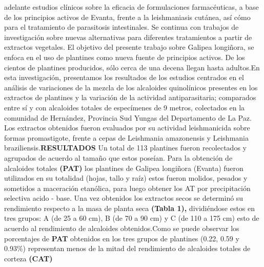 \documentclass{article}
\begin{document}
adelante estudios clínicos sobre la eficacia de formulaciones farmacéuticas, a base de los principios activos de Evanta, frente a la leishmaniasis cutánea, así cómo para el tratamiento de parasitosis intestinales. Se continua con trabajos de investigación sobre nuevas alternativas para diferentes tratamientos a partir de extractos vegetales. El objetivo del presente trabajo sobre Galipea longiñora, se enfoca en el uso de plantines como nueva fuente de principios activos. De los cientos de plantines producidos, sólo cerca de una decena llegan hasta adultos.En esta investigación, presentamos los resultados de los estudios centrados en el análisis de variaciones de la mezcla de los alcaloides quinolínicos presentes en los extractos de plantines y la variación de la actividad antiparasitaria; comparados entre sí y con alcaloides totales de especímenes de 9 metros, colectados en la comunidad de Hernández, Provincia Sud Yungas del Departamento de La Paz. Los extractos obtenidos fueron evaluados por su actividad leishmanicida sobre formas promastigote, frente a cepas de Leishmania amazonensis y Leishmania braziliensis.\textbf{RESULTADOS}
Un total de 113 plantines fueron recolectados y agrupados de acuerdo al tamaño que estos poseían. Para la obtención de alcaloides totales \textbf{(PAT) }
los plantines de Galipea longiñora (Evanta) fueron utilizados en su totalidad (hojas, tallo y raíz) estos fueron molidos, pesados y sometidos a maceración etanólica, para luego obtener los AT por precipitación selectiva acido - base. Una vez obtenidos los extractos secos se determinó su rendimiento respecto a la masa de planta seca \textbf{(Tabla 1), }
dividiéndose estos en tres grupos: A (de 25 a 60 cm), B (de 70 a 90 cm) y C (de 110 a 175 cm) esto de acuerdo al rendimiento de alcaloides obtenidos.Como se puede observar los porcentajes de \textbf{PAT }
obtenidos en los tres grupos de plantines (0.22, 0.59 y 0.93\%) representan menos de la mitad del rendimiento de alcaloides totales de corteza \textbf{(CAT) }
\end{document}
